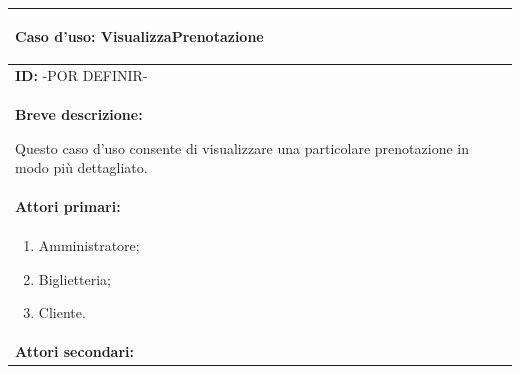 \documentclass{article}
\begin{document}
                \begin{table}[t]
                    \centering
                    \begin{tabular}{|p{\linewidth}|}
                        \hline
                        \cellcolor{gray!100}
                        \color{white}
                        \begin{center}
                            \textbf{Caso d'uso:} VisualizzaPrenotazione
                        \end{center} \\
                        \hline
                        \textbf{ID:} -POR DEFINIR- \\
                        \hline
                        \cellcolor{gray!20}
                        \textbf{Breve descrizione:}

                        Questo caso d'uso consente di visualizzare una particolare prenotazione in modo più dettagliato. \\
                        \hline
                        \textbf{Attori primari:} \\
                        \begin{minipage}{\linewidth}
                            \begin{enumerate}[noitemsep]
                                \item Amministratore;
                                \item Biglietteria;
                                \item Cliente.
                            \end{enumerate}
                        \end{minipage}
                        \vspace{0pt} \\
                        \hline
                        \textbf{Attori secondari:}


\end{tabular}
\end{table}
\end{document}
